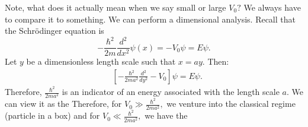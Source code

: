 \documentclass{article}
\numberwithin{equation}{section}
\begin{document}
        Note, what does it actually mean when we say small or large $V_0?$ We always have to compare it to something. We can perform a dimensional analysis. Recall that the Schrödinger equation is 
        \begin{equation*}
            -\frac{\hbar^2}{2m}\frac{d^2}{dx^2}\psi(x) = -V_0\psi = E\psi.
        \end{equation*}
        Let $y$ be a dimensionless length scale such that $x=ay.$ Then:
        \begin{align*}
            & \left[-\frac{\hbar^2}{2ma^2}\frac{d^2}{dy^2} - V_0\right]\psi = E\psi.
        \end{align*}
        Therefore, $\frac{\hbar^2}{2ma^2}$ is an indicator of an energy associated with the length scale $a.$ We can view it as the  Therefore, for $V_0 \gg \frac{\hbar^2}{2ma^2},$ we venture into the classical regime (particle in a box) and for $V_0 \ll \frac{\hbar^2}{2ma^2},$ we have the 
\end{document}
